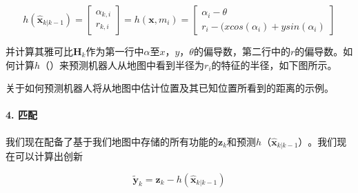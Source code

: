 \begin{equation} h(\hat{\boldsymbol{x}}_{k|k-1})=\left[\begin{array}{c}\alpha_{k,i}\\r_{k,i}\end{array}\right]=h(\boldsymbol{x},m_i)=\left[\begin{array}{c}\alpha_i-\theta\\r_i-(x cos(\alpha_i)+y sin(\alpha_i)\end{array}\right]
\end{equation}


并计算其雅可比$\boldsymbol{H}_{k}$作为第一行中$\alpha$至$x，y，\theta$的偏导数，第二行中的$r$的偏导数。如何计算$h（）$来预测机器人从地图中看到半径为$r_i$的特征的半径，如下图所示。

\begin{framed}

关于如何预测机器人将从地图中估计位置及其已知位置所看到的距离的示例。
\end{framed}


\paragraph{4. 匹配}
我们现在配备了基于我们地图中存储的所有功能的$\boldsymbol{z}_k$和预测$h（\hat{\boldsymbol{x}}_{k|k-1}）$。我们现在可以计算出创新

\begin{equation}
\tilde{\boldsymbol{y}}_{k}=\boldsymbol{z}_{k}-h(\hat{\boldsymbol{x}}_{k|k-1})
\end{equation}


